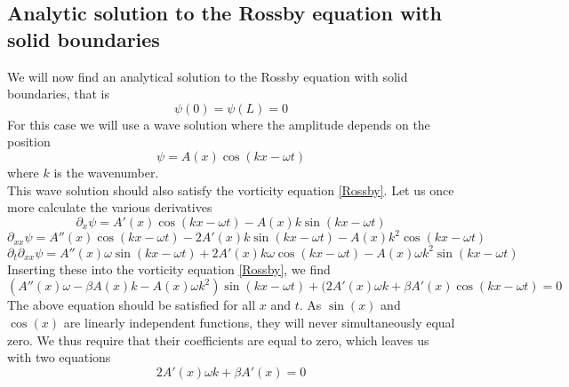 \documentclass[12pt]{article}
\numberwithin{figure}{section}
\numberwithin{table}{section}
\begin{document}
\subsection{Analytic solution to the Rossby equation with solid boundaries} \label{sec:analytical_bounded}
\noindent We will now find an analytical solution to the Rossby equation with solid boundaries, that is 
\begin{equation}
\label{boundary_solid}
\psi(0)=\psi(L)=0
\end{equation}
\noindent  For this case we will use a wave solution where the amplitude depends on the position \cite{pro5}
\begin{equation}
\label{wave_solid}
\psi=A(x)\cos(kx-\omega t)
\end{equation}
where $k$ is the wavenumber. \\
This wave solution should also satisfy the vorticity equation \eqref{Rossby}. Let us once more calculate the various derivatives
\begin{equation}
\label{eq:dpsi/dx}
\partial_x \psi = A'(x)\cos(kx-\omega t)-A(x)k\sin(kx-\omega t)
\end{equation}
\begin{equation}
\label{eq:dxxpsi}
\partial_{xx}\psi=A''(x)\cos(kx-\omega t)-2A'(x)k\sin(kx-\omega t)-A(x)k^2\cos(kx-\omega t)
\end{equation}
\begin{equation}
\label{dtdxxpsi}
\partial_t\partial_{xx}\psi=A''(x)\omega\sin(kx-\omega t)+2A'(x)k\omega\cos(kx-\omega t)-A(x)\omega k^2\sin(kx-\omega t)
\end{equation}
Inserting these into the vorticity equation \eqref{Rossby}, we find
\begin{equation}
\label{eq:vorticity_solid}
(A''(x)\omega-\beta A(x)k-A(x)\omega k^2)\sin(kx-\omega t)+(2A'(x)\omega k+\beta A'(x)\cos(kx-\omega t)=0
\end{equation}
The above equation should be satisfied for all $x$ and $t$. As $\sin(x)$ and $\cos(x)$ are linearly independent functions, they will never simultaneously equal zero. We thus require that their coefficients are equal to zero, which leaves us with two equations
\begin{equation}
\label{cos_coeff}
2A'(x)\omega k+\beta A'(x)=0
\end{equation}
\end{document}
